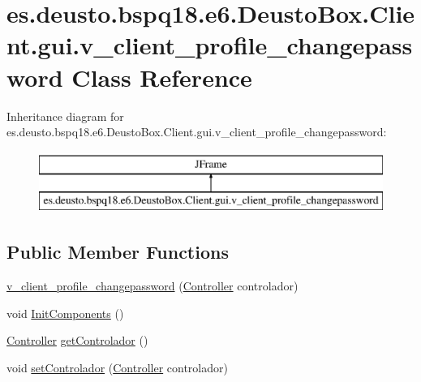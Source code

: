 \hypertarget{classes_1_1deusto_1_1bspq18_1_1e6_1_1_deusto_box_1_1_client_1_1gui_1_1v__client__profile__changepassword}{}\section{es.\+deusto.\+bspq18.\+e6.\+Deusto\+Box.\+Client.\+gui.\+v\+\_\+client\+\_\+profile\+\_\+changepassword Class Reference}
\label{classes_1_1deusto_1_1bspq18_1_1e6_1_1_deusto_box_1_1_client_1_1gui_1_1v__client__profile__changepassword}
Inheritance diagram for es.\+deusto.\+bspq18.\+e6.\+Deusto\+Box.\+Client.\+gui.\+v\+\_\+client\+\_\+profile\+\_\+changepassword\+:\begin{figure}[H]
\begin{center}
\leavevmode
\includegraphics[height=2.000000cm]{classes_1_1deusto_1_1bspq18_1_1e6_1_1_deusto_box_1_1_client_1_1gui_1_1v__client__profile__changepassword}
\end{center}
\end{figure}
\subsection*{Public Member Functions}
\begin{DoxyCompactItemize}
\item 
\mbox{\hyperlink{classes_1_1deusto_1_1bspq18_1_1e6_1_1_deusto_box_1_1_client_1_1gui_1_1v__client__profile__changepassword_ae1f450a09182d757b24752e8109e2d36}{v\+\_\+client\+\_\+profile\+\_\+changepassword}} (\mbox{\hyperlink{classes_1_1deusto_1_1bspq18_1_1e6_1_1_deusto_box_1_1_client_1_1controller_1_1_controller}{Controller}} controlador)
\item 
void \mbox{\hyperlink{classes_1_1deusto_1_1bspq18_1_1e6_1_1_deusto_box_1_1_client_1_1gui_1_1v__client__profile__changepassword_ae3a54b11b10569be31b2741464ff8e4c}{Init\+Components}} ()
\item 
\mbox{\hyperlink{classes_1_1deusto_1_1bspq18_1_1e6_1_1_deusto_box_1_1_client_1_1controller_1_1_controller}{Controller}} \mbox{\hyperlink{classes_1_1deusto_1_1bspq18_1_1e6_1_1_deusto_box_1_1_client_1_1gui_1_1v__client__profile__changepassword_a45e7afe793fab7c268a8184a86af413b}{get\+Controlador}} ()
\item 
void \mbox{\hyperlink{classes_1_1deusto_1_1bspq18_1_1e6_1_1_deusto_box_1_1_client_1_1gui_1_1v__client__profile__changepassword_aec6e48ce9720ec4eb24216ef9c5dc58d}{set\+Controlador}} (\mbox{\hyperlink{classes_1_1deusto_1_1bspq18_1_1e6_1_1_deusto_box_1_1_client_1_1controller_1_1_controller}{Controller}} controlador)
\end{DoxyCompactItemize}


